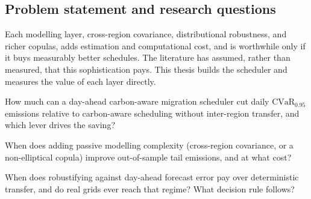 \documentclass[12pt]{article}
\newcommand{\CVaR}{\mathrm{CVaR}}
\begin{document}
\subsection{Problem statement and research questions}
Each modelling layer, cross-region covariance, distributional robustness, and richer
copulas, adds estimation and computational cost, and is worthwhile only if it buys
measurably better schedules. The literature has assumed, rather than measured, that
this sophistication pays. This thesis builds the scheduler and measures the value of
each layer directly.

\begin{description}[leftmargin=1.4em,itemsep=2pt]
\item[RQ1.] How much can a day-ahead carbon-aware migration scheduler cut daily
$\CVaR_{0.95}$ emissions relative to carbon-aware scheduling without inter-region
transfer, and which lever drives the saving?
\item[RQ2.] When does adding passive modelling complexity (cross-region covariance, or a
non-elliptical copula) improve out-of-sample tail emissions, and at what cost?
\item[RQ3.] When does robustifying against day-ahead forecast error pay over
deterministic transfer, and do real grids ever reach that regime? What decision rule
follows?
\end{description}
\end{document}
